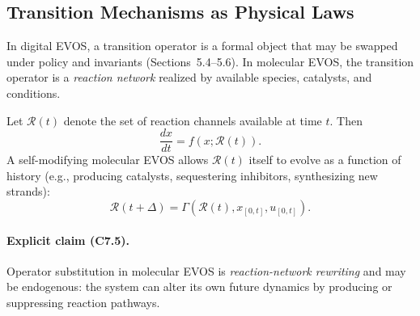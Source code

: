 \documentclass[11pt]{article}
\begin{document}
\subsection{Transition Mechanisms as Physical Laws}
\label{sec:transition-mechanisms}

In digital EVOS, a transition operator is a formal object that may be swapped under
policy and invariants (Sections~5.4--5.6). In molecular EVOS, the transition operator is
a \emph{reaction network} realized by available species, catalysts, and conditions.

Let $\mathcal{R}(t)$ denote the set of reaction channels available at time $t$. Then
\[
\frac{dx}{dt} = f(x;\mathcal{R}(t)).
\]
A self-modifying molecular EVOS allows $\mathcal{R}(t)$ itself to evolve as a function
of history (e.g., producing catalysts, sequestering inhibitors, synthesizing new strands):
\[
\mathcal{R}(t+\Delta) = \Gamma(\mathcal{R}(t), x_{[0,t]}, u_{[0,t]}).
\]

\paragraph{Explicit claim (C7.5).}
Operator substitution in molecular EVOS is \emph{reaction-network rewriting} and may be
endogenous: the system can alter its own future dynamics by producing or suppressing
reaction pathways.
\end{document}
